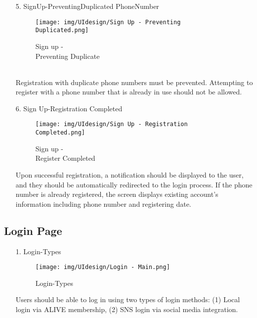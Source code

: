 \documentclass[conference]{IEEEtran}
\begin{document}
\begin{enumerate}
    \item[5.] Sign\hspace{0.5em}Up-Preventing\hspace{0.5em}Duplicated PhoneNumber
    \begin{figure}[h]
\hspace{1.5cm}
\centering
\begin{minipage}{0.4\columnwidth}
    \texttt{[image: img/UIdesign/Sign Up - Preventing Duplicated.png]}
    \caption{Sign up - \\ Preventing Duplicate}
\end{minipage}
\end{figure}
    \\ Registration with duplicate phone numbers must be prevented. Attempting to register with a phone number that is already in use should not be allowed. \\ 
\end{enumerate}

\begin{enumerate}
    \item[6.] Sign Up-Registration Completed
    \begin{figure}[h]
\hspace{1.5cm}
\centering
\begin{minipage}{0.4\columnwidth}
    \texttt{[image: img/UIdesign/Sign Up - Registration Completed.png]}
    \caption{Sign up - \\ Register Completed}
\end{minipage}
\end{figure}
    
    Upon successful registration, a notification should be displayed to the user, and they should be automatically redirected to the login process. If the phone number is already registered, the screen displays existing account’s information including phone number and registering date.
\end{enumerate}

\subsection{Login Page}

\begin{enumerate}
    \item[1.] Login-Types
    \begin{figure}[h]
\hspace{1.5cm}
\centering
\begin{minipage}{0.4\columnwidth}
    \texttt{[image: img/UIdesign/Login - Main.png]}
    \caption{Login-Types}
\end{minipage}
\end{figure}
    
    Users should be able to log in using two types of login methods: (1) Local login via ALIVE membership, (2) SNS login via social media integration. \\ 
\end{enumerate}
\end{document}
